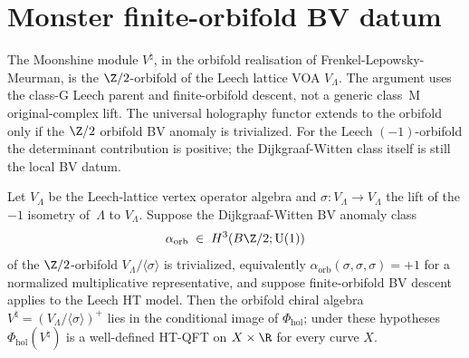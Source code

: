 \section{Monster finite-orbifold BV datum}
\label{sec:uhf-monster}

The Moonshine module $V^\natural$, in the orbifold realisation of
Frenkel-Lepowsky-Meurman, is the $\Z/2$-orbifold of the Leech
lattice VOA $V_\Lambda$. The argument uses the class-G Leech parent
and finite-orbifold descent, not a generic class~M original-complex
lift. The universal holography functor extends to the orbifold only if
the $\Z/2$ orbifold BV anomaly is trivialized. For the Leech
$(-1)$-orbifold the determinant contribution is positive; the
Dijkgraaf-Witten class itself is still the local BV datum.

\begin{theorem}
\label{thm:uhf-monster-orbifold-bv-anomaly-vanishes}
Let $V_\Lambda$ be the Leech-lattice vertex operator algebra and
$\sigma \colon V_\Lambda \to V_\Lambda$ the lift of the $-1$
isometry of~$\Lambda$ to $V_\Lambda$. Suppose the Dijkgraaf-Witten BV
anomaly class
\[
 \alpha_{\mathrm{orb}}
 \;\in\;
 H^3(B\Z/2; \mathrm{U}(1))
\]
of the $\Z/2$-orbifold $V_\Lambda / \langle \sigma \rangle$ is
trivialized, equivalently
$\alpha_{\mathrm{orb}}(\sigma,\sigma,\sigma)=+1$ for a normalized
multiplicative representative, and suppose finite-orbifold BV descent
applies to the Leech HT model. Then the orbifold chiral algebra
$V^\natural = (V_\Lambda / \langle \sigma \rangle)^+$ lies in the
conditional image of $\Phi_{\mathrm{hol}}$; under these hypotheses
$\Phi_{\mathrm{hol}}(V^\natural)$ is a well-defined HT-QFT on
$X \times \R$ for every curve $X$.
\end{theorem}

